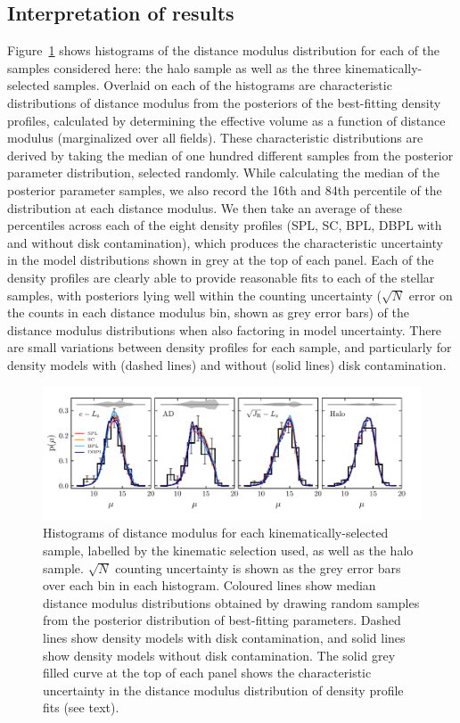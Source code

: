 \subsection{Interpretation of results}
\label{ch3:subsec:interpretation-of-results}

Figure~\ref{ch3:fig:pdistmod} shows histograms of the distance modulus distribution for each of the samples considered here: the halo sample as well as the three kinematically-selected \gse samples. Overlaid on each of the histograms are characteristic distributions of distance modulus from the posteriors of the best-fitting density profiles, calculated by determining the effective volume as a function of distance modulus (marginalized over all fields). These characteristic distributions are derived by taking the median of one hundred different samples from the posterior parameter distribution, selected randomly. While calculating the median of the posterior parameter samples, we also record the 16th and 84th percentile of the distribution at each distance modulus. We then take an average of these percentiles across each of the eight density profiles (SPL, SC, BPL, DBPL with and without disk contamination), which produces the characteristic uncertainty in the model distributions shown in grey at the top of each panel. Each of the density profiles are clearly able to provide reasonable fits to each of the stellar samples, with posteriors lying well within the counting uncertainty ($\sqrt{N}$ error on the counts in each distance modulus bin, shown as grey error bars) of the distance modulus distributions when also factoring in model uncertainty. There are small variations between density profiles for each sample, and particularly for density models with (dashed lines) and without (solid lines) disk contamination. 

\begin{figure}
    \centering
    \includegraphics[width=\textwidth]{figure/ch3/pdistmod.pdf}
    \caption{Histograms of distance modulus for each kinematically-selected \gse sample, labelled by the kinematic selection used, as well as the halo sample. $\sqrt{N}$ counting uncertainty is shown as the grey error bars over each bin in each histogram. Coloured lines show median distance modulus distributions obtained by drawing random samples from the posterior distribution of best-fitting parameters. Dashed lines show density models with disk contamination, and solid lines show density models without disk contamination. The solid grey filled curve at the top of each panel shows the characteristic uncertainty in the distance modulus distribution of density profile fits (see text).}
    \label{ch3:fig:pdistmod}
\end{figure}

